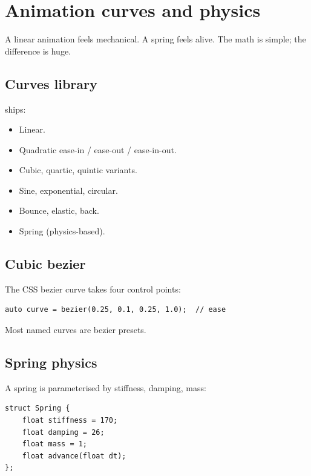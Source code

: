 \chapter{Animation curves and physics}
\label{ch:curves}

\begin{aside}
A linear animation feels mechanical. A spring feels alive.
The math is simple; the difference is huge.
\end{aside}

\section{Curves library}

\maya{} ships:

\begin{itemize}[leftmargin=*]
  \item Linear.
  \item Quadratic ease-in / ease-out / ease-in-out.
  \item Cubic, quartic, quintic variants.
  \item Sine, exponential, circular.
  \item Bounce, elastic, back.
  \item Spring (physics-based).
\end{itemize}

\section{Cubic bezier}

The CSS bezier curve takes four control points:

\begin{lstlisting}
auto curve = bezier(0.25, 0.1, 0.25, 1.0);  // ease
\end{lstlisting}

Most named curves are bezier presets.

\section{Spring physics}

A spring is parameterised by stiffness, damping, mass:

\begin{lstlisting}
struct Spring {
    float stiffness = 170;
    float damping = 26;
    float mass = 1;
    float advance(float dt);
};
\end{lstlisting}

